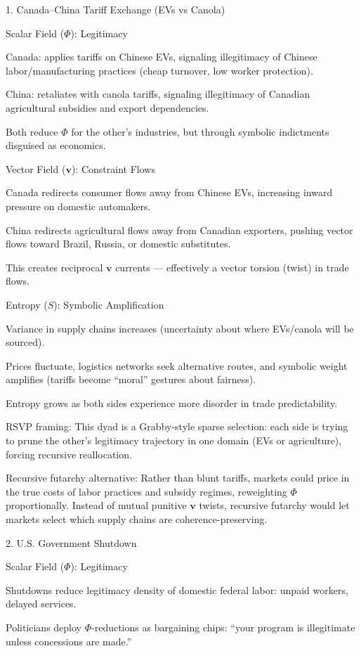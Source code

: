 \documentclass{article}
\begin{document}
1. Canada–China Tariff Exchange (EVs vs Canola)

Scalar Field ($\Phi$): Legitimacy

Canada: applies tariffs on Chinese EVs, signaling illegitimacy of Chinese labor/manufacturing practices (cheap turnover, low worker protection).

China: retaliates with canola tariffs, signaling illegitimacy of Canadian agricultural subsidies and export dependencies.

Both reduce $\Phi$ for the other’s industries, but through symbolic indictments disguised as economics.


Vector Field ($\mathbf{v}$): Constraint Flows

Canada redirects consumer flows away from Chinese EVs, increasing inward pressure on domestic automakers.

China redirects agricultural flows away from Canadian exporters, pushing vector flows toward Brazil, Russia, or domestic substitutes.

This creates reciprocal $\mathbf{v}$ currents — effectively a vector torsion (twist) in trade flows.


Entropy ($S$): Symbolic Amplification

Variance in supply chains increases (uncertainty about where EVs/canola will be sourced).

Prices fluctuate, logistics networks seek alternative routes, and symbolic weight amplifies (tariffs become “moral” gestures about fairness).

Entropy grows as both sides experience more disorder in trade predictability.


RSVP framing:
This dyad is a Grabby-style sparse selection: each side is trying to prune the other’s legitimacy trajectory in one domain (EVs or agriculture), forcing recursive reallocation.

Recursive futarchy alternative:
Rather than blunt tariffs, markets could price in the true costs of labor practices and subsidy regimes, reweighting $\Phi$ proportionally. Instead of mutual punitive $\mathbf{v}$ twists, recursive futarchy would let markets select which supply chains are coherence-preserving.


2. U.S. Government Shutdown

Scalar Field ($\Phi$): Legitimacy

Shutdowns reduce legitimacy density of domestic federal labor: unpaid workers, delayed services.

Politicians deploy $\Phi$-reductions as bargaining chips: “your program is illegitimate unless concessions are made.”
\end{document}
